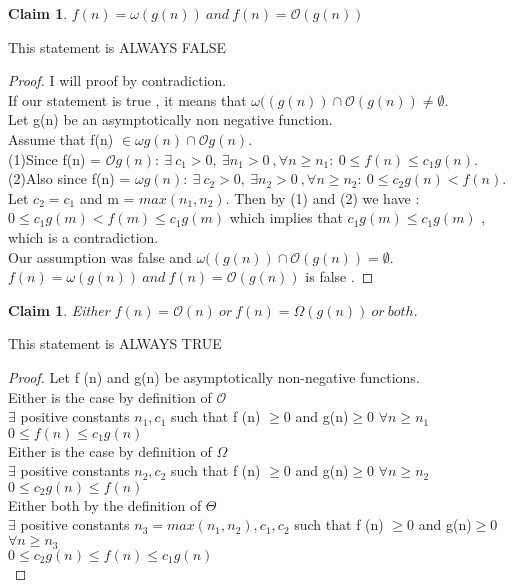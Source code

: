 \documentclass[10 pt]{article}
\newtheorem{claim}[theorem]{Claim}
\begin{document}
\begin {claim}
$f(n) = \omega (g(n)) \ and \ f(n) = \mathcal{O} (g(n))$
\end {claim}
This statement is ALWAYS  FALSE 
\begin {proof}
I will proof by contradiction.\\  If our statement is true , it means that $\omega((g(n)) \cap \mathcal{O}(g(n)) \ne \emptyset.$ \\
Let g(n) be an asymptotically non negative function.\\
Assume that f(n) $\in \omega g(n) \cap \mathcal{O} g(n). $\\
 (1)Since f(n) = $\mathcal{O} g(n) : \ \exists \ c_1 > 0, \ \exists n_1 > 0 \ ,\forall n \geq n_1: \ 0 \leq f(n) \leq c_1g(n).$  \\
 (2)Also since f(n) = $\omega g(n) : \ \exists \ c_2 > 0, \ \exists n_2 > 0 \ ,\forall n \geq n_2 :\ 0 \leq c_2g(n) < f(n).$  \\
 Let $c_2 = c_1$ and m = $max(n_1, n_2)$. Then  by (1) and (2) we have :\\
  $ 0 \leq c_1g(m) < f(m)  \leq c_1g(m)$ which implies that $c_1g(m)  \leq c_1g(m)$ , which is a contradiction.\\
  Our assumption was false and $\omega((g(n)) \cap \mathcal{O}(g(n)) = \emptyset.$ \\
  $f(n) = \omega (g(n)) \ and \ f(n) = \mathcal{O} (g(n))$ is false .
 
 
\end {proof}



\begin {claim}
Either $  f(n) = \mathcal{O}(n)  \ or  \ f(n) = \Omega (g(n))  \ or \  both.$
\end {claim}
This statement is  ALWAYS TRUE
\begin {proof}
Let f (n) and g(n) be asymptotically non-negative functions.\\
 Either is the case by definition of $ \mathcal{O}$\\
 $\exists $   positive constants $n_1, c_1 $ such that  f (n) $\geq 0$  and g(n)$ \geq 0$  $ \forall n   \geq n_1$ \\
$ 0 \leq  f (n) \leq  c_1 g(n)$ \\
 Either is the case by definition of $ \Omega$\\
 $\exists $   positive constants $n_2, c_2 $ such that  f (n) $\geq 0$  and g(n)$ \geq 0$  $ \forall n   \geq n_2$ \\
$ 0 \leq  c_2g(n) \leq  f(n)$ \\
Either both by the definition  of $ \Theta$\\
 $\exists $   positive constants $ n_3 = max(n_1, n_2), c_1 ,c_2$ such that  f (n) $\geq 0$  and g(n)$ \geq 0$  $ \forall n   \geq n_3$ \\
$ 0 \leq  c_2g(n) \leq  f(n) \leq c_1g(n)$ \\

\end {proof}
\end{document}

